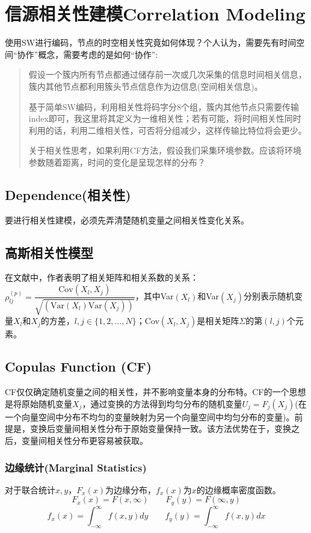 \section{信源相关性建模Correlation Modeling}
使用SW进行编码，节点的时空相关性究竟如何体现？个人认为，需要先有时间空间``协作''概念，需要考虑的是如何``协作'':
\begin{quote}
    假设一个簇内所有节点都通过储存前一次或几次采集的信息时间相关信息，簇内其他节点都利用簇头节点信息作为边信息(空间相关信息)。

    基于简单SW编码\cite{Srisooksai2012}，利用相关性将码字分8个组，簇内其他节点只需要传输index即可，我这里将其定义为一维相关性；若有可能，将时间相关性同时利用的话，利用二维相关性，可否将分组减少，这样传输比特位将会更少。

    关于相关性思考，如果利用CF方法，假设我们采集环境参数。应该将环境参数随着距离，时间的变化是呈现怎样的分布？
\end{quote}

\subsection{Dependence(相关性)}
要进行相关性建模，必须先弄清楚随机变量之间相关性变化关系。

\subsection{高斯相关性模型}
在文献\cite{Deligiannis2012}中，作者表明了相关矩阵和相关系数的关系：$\rho_{lj}^{(p)} = \dfrac{\text{Cov}(X_l,X_j)}{\sqrt{\left(\text{Var}(X_l)\text{Var}(X_j)\right)}}$，其中Var$(X_l)$和Var$(X_j)$分别表示随机变量$X_l$和$X_j$的方差，$l,j \in \{1,2,\dots,N\}$；Cov$(X_l,X_j)$是相关矩阵$\Sigma$的第$(l,j)$个元素。


\subsection{Copulas Function (CF)}
CF仅仅确定随机变量之间的相关性，并不影响变量本身的分布特。CF的一个思想是将原始随机变量$X_j$，通过变换的方法得到均匀分布的随机变量$U_j = F_j(X_j)$(在一个向量空间中分布不均匀的变量映射为另一个向量空间中均匀分布的变量)。前提是，变换后变量间相关性分布于原始变量保持一致。该方法优势在于，变换之后，变量间相关性分布更容易被获取。
\subsubsection{边缘统计(Marginal Statistics)}
对于联合统计$x,y$，$F_x(x)$为边缘分布，$f_x(x)$为$x$的边缘概率密度函数。
\begin{equation}
    F_x(x) = F(x,\infty) \qquad F_y(y) = F(\infty,y)
    \label{eq0.1}
\end{equation}
\begin{equation}
    f_x(x) = \int_{-\infty}^{\infty} f(x,y) dy \qquad f_y(y) = \int_{-\infty}^{\infty} f(x,y) dx
    \label{eq0.2}
\end{equation}

